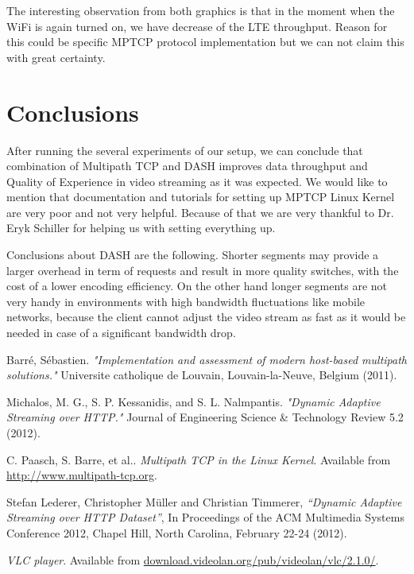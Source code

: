 \documentclass{llncs}
\begin{document}
The interesting observation from both graphics is that in the moment when the WiFi is again turned on, we have decrease of the LTE throughput. Reason for this could be specific MPTCP protocol implementation but we can not claim this with great certainty.


\section{Conclusions}
After running the several experiments of our setup, we can conclude that combination of Multipath TCP and DASH improves data throughput and Quality of Experience in video streaming as it was expected. We would like to mention that documentation and tutorials for setting up MPTCP Linux Kernel \cite{linuxMPTCP} are very poor and not very helpful. Because of that we are very thankful to Dr. Eryk Schiller for helping us with setting everything up. 

Conclusions about DASH are the following. Shorter segments may provide a larger overhead in term of requests and result in more quality switches, with the cost of a lower encoding efficiency. On the other hand longer segments are not very handy in environments with high bandwidth fluctuations like mobile networks, because the client cannot adjust the video stream as fast as it would be needed in case of a significant bandwidth drop.



\begin{thebibliography}{1}
Barré, Sébastien. \emph{"Implementation and assessment of modern host-based multipath solutions." } Universite catholique de Louvain, Louvain-la-Neuve, Belgium (2011).

Michalos, M. G., S. P. Kessanidis, and S. L. Nalmpantis. \emph{"Dynamic Adaptive Streaming over HTTP."} Journal of Engineering Science \& Technology Review 5.2 (2012).

C. Paasch, S. Barre, et al.. \emph{Multipath TCP in the Linux Kernel}. Available from \url{http://www.multipath-tcp.org}.

Stefan Lederer, Christopher Müller and Christian Timmerer, \emph{“Dynamic Adaptive Streaming over HTTP Dataset”}, In Proceedings of the ACM Multimedia Systems Conference 2012, Chapel Hill, North Carolina, February 22-24 (2012). 

\emph{VLC player}. Available from \url{download.videolan.org/pub/videolan/vlc/2.1.0/}.

\end{thebibliography}
\end{document}
